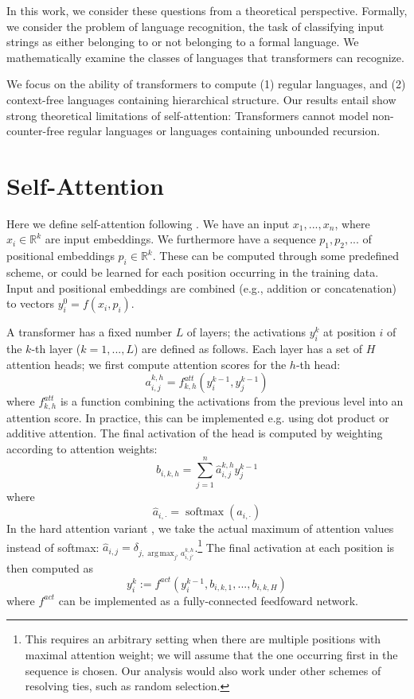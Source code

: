 \documentclass[11pt,a4paper]{article}
\DeclareMathOperator*{\argmax}{arg\,max}
\begin{document}
In this work, we consider these questions from a theoretical perspective.
Formally, we consider the problem of language recognition, the task of classifying input strings as either belonging to or not belonging to a formal language.
We mathematically examine the classes of languages that transformers can recognize.

We focus on the ability of transformers to compute (1) regular languages, and (2) context-free languages containing hierarchical structure.
Our results entail show strong theoretical limitations of self-attention:
Transformers cannot model non-counter-free regular languages or languages containing unbounded recursion.


\section{Self-Attention}
Here we define self-attention following \cite{vaswani2017attention}.
We have an input $x_1,...,x_n$, where $x_i \in \mathbb{R}^k$ are input embeddings.
We furthermore have a sequence $p_1, p_2, ...$ of positional embeddings $p_i \in \mathbb{R}^k$. These can be computed through some predefined scheme, or could be learned for each position occurring in the training data.
Input and positional embeddings are combined (e.g., addition or concatenation) to vectors $y_i^0 = f(x_i, p_i)$.

A transformer has a fixed number $L$ of layers; the activations $y_i^k$ at position $i$ of the $k$-th layer ($k=1, ..., L$) are defined as follows.
Each layer has a set of $H$ attention heads; we first compute attention scores for the $h$-th head:
\begin{equation}
    a_{i,j}^{k,h} = f^{att}_{k,h}(y_i^{k-1}, y_j^{k-1})
\end{equation}
where $f^{att}_{k,h}$ is a function combining the activations from the previous level into an attention score.
In practice, this can be implemented e.g. using dot product or additive attention.
The final activation of the head is computed by weighting according to attention weights:
\begin{equation}
    b_{i,k,h} = \sum_{j=1}^n \hat{a}_{i,j}^{k,h} y_j^{k-1}
\end{equation}
where $$ \hat{a}_{i,\cdot} = \operatorname{softmax}(a_{i,\cdot}) $$
In the hard attention variant \cite{perez2019turing} , we take the actual maximum of attention values instead of softmax:
$\hat{a}_{i,j} = \delta_{j, \argmax_{j'} a_{i,j'}^{k,h}}$.\footnote{This requires an arbitrary setting when there are multiple positions with maximal attention weight; we will assume that the one occurring first in the sequence is chosen. Our analysis would also work under other schemes of resolving ties, such as random selection.}
The final activation at each position is then computed as
\begin{equation}
    y_i^k := f^{act}(y_i^{k-1}, b_{i,k,1}, ..., b_{i,k,H})
\end{equation}
where $f^{act}$ can be implemented as a fully-connected feedfoward network.
\end{document}
